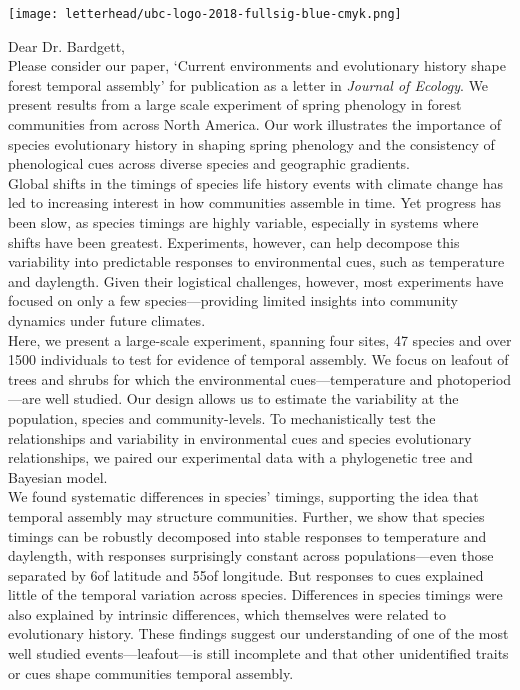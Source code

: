 \documentclass[11pt,a4paper]{article}
\begin{document}

\noindent \texttt{[image: letterhead/ubc-logo-2018-fullsig-blue-cmyk.png]}

\noindent Dear Dr. Bardgett,\\

\noindent Please consider our paper, `Current environments and evolutionary history shape forest temporal assembly' for publication as a letter in \emph{Journal of Ecology}. We present results from a large scale experiment of spring phenology in forest communities from across North America. Our work illustrates the importance of species evolutionary history in shaping spring phenology and the consistency of phenological cues across diverse species and geographic gradients. 
\vspace{1.5ex}\\ 
Global shifts in the timings of species life history events with climate change has led to increasing interest in how communities assemble in time. Yet progress has been slow, as species timings are highly variable, especially in systems where shifts have been greatest. Experiments, however, can help decompose this variability into predictable responses to environmental cues, such as temperature and daylength. Given their logistical challenges, however, most experiments have focused on only a few species---providing limited insights into community dynamics under future climates. %
\vspace{1.5ex}\\
\noindent %
Here, we present a large-scale experiment, spanning four sites, 47 species and over 1500 individuals to test for evidence of temporal assembly.  We focus on leafout of trees and shrubs for which the environmental cues---temperature and photoperiod---are well studied. Our design allows us to estimate the variability at the population, species and community-levels. To mechanistically test the relationships and variability in environmental cues and species evolutionary relationships, we paired our experimental data with a phylogenetic tree and Bayesian model. 
\vspace{1.5 ex}\\
\noindent  We found systematic differences in species' timings, supporting the idea that temporal assembly may structure communities. Further, we show that species timings can be robustly decomposed into stable responses to temperature and daylength, with responses surprisingly constant across populations---even those separated by 6\textdegree  of latitude and 55\textdegree  of longitude. But responses to cues explained little of the temporal variation across species. Differences in species timings were also explained by intrinsic differences, which themselves were related to evolutionary history. These findings suggest our understanding of one of the most well studied events---leafout---is still incomplete and that other unidentified traits or cues shape communities temporal assembly. 
\end{document}
